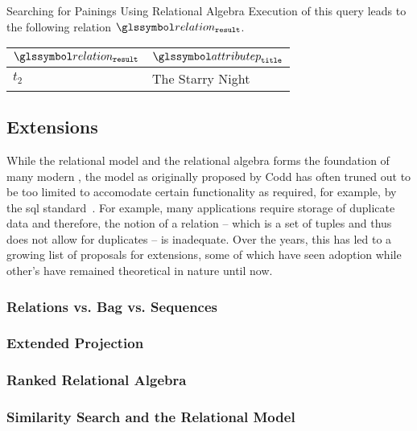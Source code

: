 \begin{example}[label=example:rel_alg_query]{Searching for Painings Using Relational Algebra}{}
    Execution of this query leads to the following relation $\relation_{\mathtt{result}}$.

    \begin{center}
        \begin{tabular}{ l || l |}
            $\relation_{\mathtt{result}}$ & $\attributep_{\mathtt{title}}$  \\ 
            \hline
            \hline
            $t_2$ & The Starry Night \\
            \hline
        \end{tabular}
    \end{center}
\end{example}

\subsection{Extensions}
\label{section:rel_extensions}

While the relational model and the relational algebra forms the foundation of many modern , the model as originally proposed by Codd has often truned out to be too limited to accomodate certain functionality as required, for example, by the \acrshort{sql} standard~\cite{Chamberlin:2012Early,Garcia:2009Database}. For example, many applications require storage of duplicate data and therefore, the notion of a relation -- which is a set of tuples and thus does not allow for duplicates -- is inadequate. Over the years, this has led to a growing list of proposals for extensions, some of which have seen adoption while other's have remained theoretical in nature until now.

\subsubsection{Relations vs. Bag vs. Sequences}

\subsubsection{Extended Projection}

\subsubsection{Ranked Relational Algebra}

\subsubsection{Similarity Search and the Relational Model}


